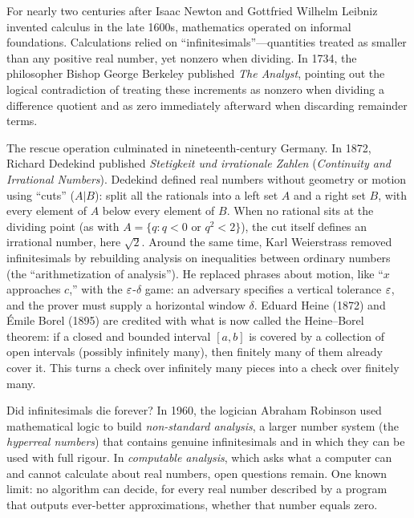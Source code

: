 \begin{historybox}
For nearly two centuries after Isaac Newton and Gottfried Wilhelm Leibniz invented calculus in the late 1600s, mathematics operated on informal foundations. Calculations relied on ``infinitesimals''---quantities treated as smaller than any positive real number, yet nonzero when dividing. In 1734, the philosopher Bishop George Berkeley published \emph{The Analyst}, pointing out the logical contradiction of treating these increments as nonzero when dividing a difference quotient and as zero immediately afterward when discarding remainder terms.

The rescue operation culminated in nineteenth-century Germany. In 1872, Richard Dedekind published \emph{Stetigkeit und irrationale Zahlen} (\emph{Continuity and Irrational Numbers}). Dedekind defined real numbers without geometry or motion using ``cuts'' ($A | B$): split all the rationals into a left set $A$ and a right set $B$, with every element of $A$ below every element of $B$. When no rational sits at the dividing point (as with $A = \{q : q < 0 \text{ or } q^2 < 2\}$), the cut itself defines an irrational number, here $\sqrt{2}$. Around the same time, Karl Weierstrass removed infinitesimals by rebuilding analysis on inequalities between ordinary numbers (the ``arithmetization of analysis''). He replaced phrases about motion, like ``$x$ approaches $c$,'' with the $\varepsilon$-$\delta$ game: an adversary specifies a vertical tolerance $\varepsilon$, and the prover must supply a horizontal window $\delta$. Eduard Heine (1872) and \'Emile Borel (1895) are credited with what is now called the Heine--Borel theorem: if a closed and bounded interval $[a, b]$ is covered by a collection of open intervals (possibly infinitely many), then finitely many of them already cover it. This turns a check over infinitely many pieces into a check over finitely many.

Did infinitesimals die forever? In 1960, the logician Abraham Robinson used mathematical logic to build \emph{non-standard analysis}, a larger number system (the \emph{hyperreal numbers}) that contains genuine infinitesimals and in which they can be used with full rigour. In \emph{computable analysis}, which asks what a computer can and cannot calculate about real numbers, open questions remain. One known limit: no algorithm can decide, for every real number described by a program that outputs ever-better approximations, whether that number equals zero.
\end{historybox}

